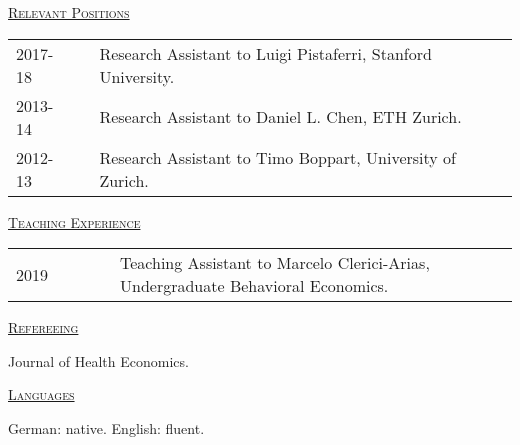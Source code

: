 \documentclass[letterpaper,11pt]{article}
\begin{document}
 \bigskip
 
\underline {\textsc{Relevant Positions}}

\begin{tabular}{@{}l@{}cl@{}cl}
2017-18 & & Research Assistant to Luigi Pistaferri, Stanford University. \\
2013-14 & & Research Assistant to Daniel L. Chen, ETH Zurich. \\
2012-13 & & Research Assistant to Timo Boppart, University of Zurich.
\end{tabular}

\bigskip
 
\underline {\textsc{Teaching Experience}}

\begin{tabular}{@{}l@{}cl@{}cl}
2019 & \ \ \ \ \ & Teaching Assistant to Marcelo Clerici-Arias, Undergraduate Behavioral Economics.
\end{tabular}

\bigskip
 
\underline {\textsc{Refereeing}}

Journal of Health Economics.

\bigskip
 
\underline {\textsc{Languages}}

German: native. English: fluent.
\end{document}
